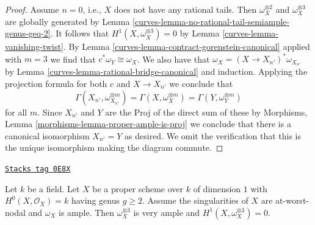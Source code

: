 \begin{proof}
\medskip\noindent
Assume $n = 0$, i.e., $X$ does not have any rational tails.
Then $\omega_X^{\otimes 2}$ and $\omega_X^{\otimes 3}$ are
globally generated by Lemma \ref{curves-lemma-no-rational-tail-semiample-genus-geq-2}.
It follows that $H^1(X, \omega_X^{\otimes 3}) = 0$ by
Lemma \ref{curves-lemma-vanishing-twist}.
By Lemma \ref{curves-lemma-contract-gorenstein-canonical} applied with $m = 3$
we find that $c^*\omega_Y \cong \omega_X$.
We also have that $\omega_X = (X \to X_{n'})^*\omega_{X_{n'}}$ by
Lemma \ref{curves-lemma-rational-bridge-canonical} and induction.
Applying the projection formula for both $c$ and
$X \to X_{n'}$ we conclude that
$$
\Gamma(X_{n'}, \omega_{X_{n'}}^{\otimes m}) =
\Gamma(X, \omega_X^{\otimes m}) =
\Gamma(Y, \omega_Y^{\otimes m})
$$
for all $m$.
Since $X_{n'}$ and $Y$ are the Proj of the direct sum of these
by Morphisms, Lemma \ref{morphisms-lemma-proper-ample-is-proj}
we conclude that there is a canonical isomorphism $X_{n'} = Y$
as desired. We omit the verification that this is the unique
isomorphism making the diagram commute.
\end{proof}

\begin{lemma}[Tricanonical]
\label{curves-lemma-tricanonical}
\href{https://stacks.math.columbia.edu/tag/0E8X}{\texttt{Stacks tag 0E8X}}

Let $k$ be a field. Let $X$ be a proper scheme over $k$ of dimension $1$ with
$H^0(X, \mathcal{O}_X) = k$ having genus $g \geq 2$. Assume the singularities
of $X$ are at-worst-nodal and $\omega_X$ is ample. Then
$\omega_X^{\otimes 3}$ is very ample and $H^1(X, \omega_X^{\otimes 3}) = 0$.
\end{lemma}

